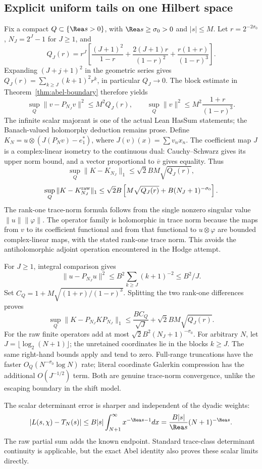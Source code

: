 \subsection{Explicit uniform tails on one Hilbert space}
Fix a compact $Q\subset\{\Rea s>0\}$, with $\Rea s\ge\sigma_0>0$ and $|s|\le M$. Let $r=2^{-2\sigma_0}$, $N_J=2^J-1$ for $J\ge1$, and
\[
 Q_J(r)=r^J\left[\frac{(J+1)^2}{1-r}
       +\frac{2(J+1)r}{(1-r)^2}+\frac{r(1+r)}{(1-r)^3}\right].
\]
Expanding $(J+j+1)^2$ in the geometric series gives
$Q_J(r)=\sum_{k\ge J}(k+1)^2r^k$, in particular $Q_J\to0$. The block estimate in Theorem~\ref{thm:abel-boundary} therefore yields
\[
 \sup_Q\|v-P_{N_J}v\|^2\le M^2Q_J(r),\qquad
 \sup_Q\|v\|^2\le M^2\frac{1+r}{(1-r)^3}.
\]
The infinite scalar majorant is one of the actual Lean HasSum statements; the Banach-valued holomorphy deduction remains prose. Define $K_N=u\otimes(J(P_Nv)-e_1^*)$, where $J(v)(x)=\sum v_nx_n$. The coefficient map $J$ is a complex-linear isometry to the continuous dual: Cauchy--Schwarz gives its upper norm bound, and a vector proportional to $\overline v$ gives equality. Thus
\[
 \sup_Q\|K-K_{N_J}\|_1\le\sqrt2 BM\sqrt{Q_J(r)},
\]
\[
 \sup_Q\|K-K_{N_J}^{\rm raw}\|_1
 \le\sqrt2 B\left[M\sqrt{Q_J(r)}+B(N_J+1)^{-\sigma_0}\right].
\]
The rank-one trace-norm formula follows from the single nonzero singular value $\|u\|\|\varphi\|$. The operator family is holomorphic in trace norm because the maps from $v$ to its coefficient functional and from that functional to $u\otimes\varphi$ are bounded complex-linear maps, with the stated rank-one trace norm. This avoids the antiholomorphic adjoint operation encountered in the Hodge attempt.

For $J\ge1$, integral comparison gives
\[
 \|u-P_{N_J}u\|^2\le B^2\sum_{k\ge J}(k+1)^{-2}\le B^2/J.
\]
Set $C_Q=1+M\sqrt{(1+r)/(1-r)^3}$. Splitting the two rank-one differences proves
\[
 \sup_Q\|K-P_{N_J}KP_{N_J}\|_1
 \le\frac{BC_Q}{\sqrt J}+\sqrt2 BM\sqrt{Q_J(r)}.
\]
For the raw finite operators add at most $\sqrt2B^2(N_J+1)^{-\sigma_0}$. For arbitrary $N$, let $J=\lfloor\log_2(N+1)\rfloor$; the unretained coordinates lie in the blocks $k\ge J$. The same right-hand bounds apply and tend to zero. Full-range truncations have the faster $O_Q(N^{-\sigma_0}\log N)$ rate; literal coordinate Galerkin compression has the additional $O(J^{-1/2})$ term. Both are genuine trace-norm convergence, unlike the escaping boundary in the shift model.

The scalar determinant error is sharper and independent of the dyadic weights:
\[
 |L(s,\chi)-T_N(s)|
 \le B|s|\int_{N+1}^\infty x^{-\Rea s-1}dx
 =\frac{B|s|}{\Rea s}(N+1)^{-\Rea s}.
\]
The raw partial sum adds the known endpoint. Standard trace-class determinant continuity \cite{Bornemann} is applicable, but the exact Abel identity also proves these scalar limits directly.

